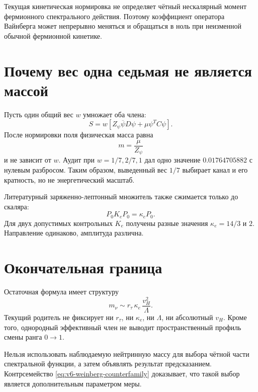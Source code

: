 \begin{theorem}
Текущая кинетическая нормировка не определяет чётный нескалярный момент
фермионного спектрального действия. Поэтому коэффициент оператора
Вайнберга может непрерывно меняться и обращаться в ноль при неизменной
обычной фермионной кинетике.
\end{theorem}

\section{Почему вес одна седьмая не является массой}

Пусть один общий вес $w$ умножает оба члена:
\begin{equation}
 S=w\left[Z_\psi\overline\psi D\psi+
 \mu\psi^TC\psi\right].
\end{equation}
После нормировки поля физическая масса равна
\begin{equation}
 m=\frac{\mu}{Z_\psi}
\end{equation}
и не зависит от $w$. Аудит при $w=1/7,2/7,1$ дал одно значение
$0.01764705882$ с нулевым разбросом. Таким образом, выведенный вес
$1/7$ выбирает канал и его кратность, но не энергетический масштаб.

Литературный заряженно-лептонный множитель также сжимается только до
скаляра:
\begin{equation}
 P_0K_eP_0=\kappa_eP_0.
\end{equation}
Для двух допустимых контрольных $K_e$ получены разные значения
$\kappa_e=14/3$ и $2$. Направление одинаково, амплитуда различна.

\section{Окончательная граница}

Остаточная формула имеет структуру
\begin{equation}
 m_\nu\sim r_\tau\,\kappa_e\,\frac{v_H^2}{\Lambda}.
\end{equation}
Текущий родитель не фиксирует ни $r_\tau$, ни $\kappa_e$, ни
$\Lambda$, ни абсолютный $v_H$. Кроме того, однородный эффективный член
не выводит пространственный профиль смены ранга $0\to1$.

\begin{nogocriterion}
Нельзя использовать наблюдаемую нейтринную массу для выбора чётной части
спектральной функции, а затем объявлять результат предсказанием.
Контрсемейство \eqref{eq:v6-weinberg-counterfamily} доказывает, что такой
выбор является дополнительным параметром меры.
\end{nogocriterion}

